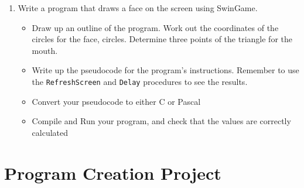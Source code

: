 \begin{enumerate}
  \item Write a program that draws a face on the screen using SwinGame.
  \begin{itemize}
    \item Draw up an outline of the program. Work out the coordinates of the circles for the face, circles. Determine three points of the triangle for the mouth.
    \item Write up the pseudocode for the program's instructions. Remember to use the \texttt{RefreshScreen} and \texttt{Delay} procedures to see the results.
    \item Convert your pseudocode to either C or Pascal
    \item Compile and Run your program, and check that the values are correctly calculated
  \end{itemize}
\end{enumerate}


\clearpage
\section{Program Creation Project} %
\label{sec:program_creation_project}


